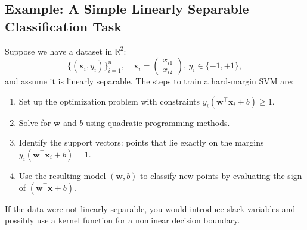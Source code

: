 \documentclass[12pt,a4paper]{article}
\begin{document}
\subsection{Example: A Simple Linearly Separable Classification Task}
Suppose we have a dataset in $\mathbb{R}^2$:
\[
\{(\mathbf{x}_i,y_i)\}_{i=1}^n, \quad \mathbf{x}_i=\begin{pmatrix}x_{i1}\\x_{i2}\end{pmatrix}, \, y_i \in \{-1,+1\},
\]
and assume it is linearly separable. The steps to train a hard-margin SVM are:
\begin{enumerate}
    \item Set up the optimization problem with constraints $y_i(\mathbf{w}^\top \mathbf{x}_i + b) \ge 1$.
    \item Solve for $\mathbf{w}$ and $b$ using quadratic programming methods.
    \item Identify the support vectors: points that lie exactly on the margins $y_i(\mathbf{w}^\top \mathbf{x}_i + b)=1$.
    \item Use the resulting model $(\mathbf{w},b)$ to classify new points by evaluating the sign of $(\mathbf{w}^\top \mathbf{x} + b)$.
\end{enumerate}

If the data were not linearly separable, you would introduce slack variables and possibly use a kernel function for a nonlinear decision boundary.
\end{document}
